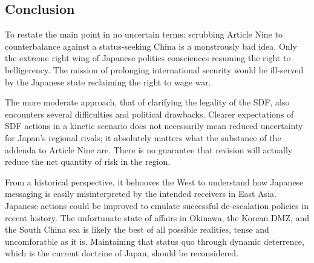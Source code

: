 \documentclass[letterpaper,12pt,twoside]{article} %
\begin{document}
\begin{multicols}{2}
\section{Conclusion}

To restate the main point in no uncertain terms: scrubbing Article Nine to counterbalance against a status-seeking China is a monstrously bad idea. Only the extreme right wing of Japanese politics consciences resuming the right to belligerency. The mission of prolonging international security would be ill-served by the Japanese state reclaiming the right to wage war.

The more moderate approach, that of clarifying the legality of the SDF, also encounters several difficulties and political drawbacks. Clearer expectations of SDF actions in a kinetic scenario does not necessarily mean reduced uncertainty for Japan's regional rivals; it absolutely matters what the substance of the addenda to Article Nine are. There is no guarantee that revision will actually reduce the net quantity of risk in the region.

From a historical perspective, it behooves the West to understand how Japanese messaging is easily misinterpreted by the intended receivers in East Asia. Japanese actions could be improved to emulate successful de-escalation policies in recent history. The unfortunate state of affairs in Okinawa, the Korean DMZ, and the South China sea is likely the best of all possible realities, tense and uncomforatble as it is. Maintaining that status quo through dynamic deterrence, which is the current doctrine of Japan, should be reconsidered.

\end{multicols}
  \pagebreak

\nocite{auslin2016foreignaffairs}
\nocite{berkofsky2010protagonists}
\nocite{hirata2009debate}
\nocite{ichihara2020crisis}
\nocite{iriye1990china}
\nocite{izumikawa2010antimilitarism}
\nocite{izumikawa2013attitudes}
\nocite{kimura2014coldwar}
\nocite{lind2004pacifism}
\nocite{lind2018trump}
\nocite{maslow2015blueprint}
\nocite{miller2011rearm}
\nocite{smith2015intimate}
\nocite{smith2019rearmed}
\nocite{sissons1961pacifist}
\nocite{takeshi1985domestic}
\nocite{ueki2020deterrence}
\nocite{xinbo2005end}
\nocite{yiu1971prospect}


\printbibliography[heading=bibintoc,title=Bibliography]


\end{document}
